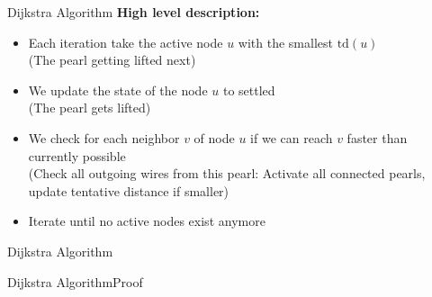 \begin{frame}{Dijkstra Algorithm}
  \textbf{High level description:}
  \begin{itemize}
    \item
      Each iteration take the {\color{Mittel-Blau}active} node
      {\color{Mittel-Blau}$u$} with the
      {\color{Mittel-Blau}smallest $\mathrm{td}(u)$}\\
      {\color{gray}(The pearl getting lifted next)}
    \item
      We update the state of the node {\color{Mittel-Blau}$u$} to
      {\color{Mittel-Blau}settled}\\
      {\color{gray}(The pearl gets lifted)}
    \item
      We check for each {\color{Mittel-Blau}neighbor $v$} of node
      {\color{Mittel-Blau}$u$} if we can reach {\color{Mittel-Blau}$v$} faster
      than currently possible\\
      {\color{gray}(Check all outgoing wires from this pearl:
        Activate all connected pearls, update
        tentative distance if smaller)}
    \item
      Iterate until no active nodes exist anymore
  \end{itemize}
\end{frame}


\begin{frame}{Dijkstra Algorithm}
  \vspace{-1em}
  \begin{figure}[!h]
    \begin{adjustbox}{width=\linewidth}
      
    \end{adjustbox}
    \vspace{-2em}
    \caption{%
    }
  \end{figure}
\end{frame}


\begin{frame}{Dijkstra Algorithm}{Proof}
\end{frame}